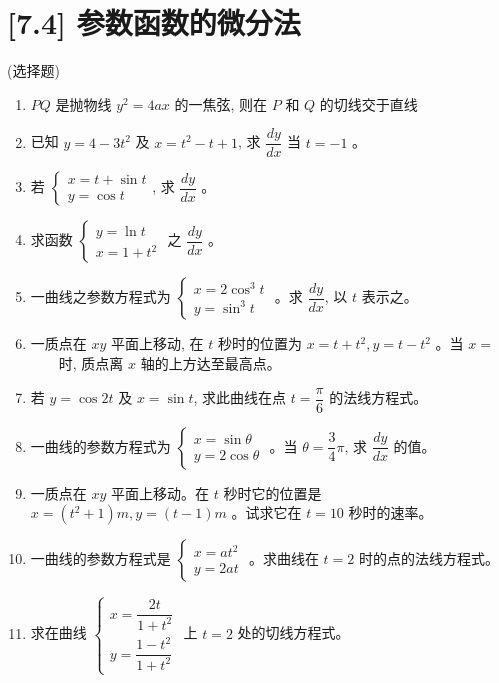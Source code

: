 \documentclass[10pt]{article}
\begin{document}
\begin{enumerate}
\end{enumerate}


\section*{[7.4] 参数函数的微分法}
(选择题)

\begin{enumerate}
  \item $PQ$ 是抛物线 $y^{2}=4 a x$ 的一焦弦, 则在 $P$ 和 $Q$ 的切线交于直线
  \item 已知 $y=4-3 t^{2}$ 及 $x=t^{2}-t+1$, 求 $\dfrac{d y}{d x}$ 当 $t=-1$ 。
  \item 若 $\left\{\begin{array}{l}x=t+\sin t \\ y=\cos t\end{array}\right.$, 求 $\dfrac{d y}{d x}$ 。
  \item 求函数 $\left\{\begin{array}{l}y=\ln t \\ x=1+t^{2}\end{array}\right.$ 之 $\dfrac{d y}{d x}$ 。
  \item 一曲线之参数方程式为 $\left\{\begin{array}{l}x=2 \cos ^{3} t \\ y=\sin ^{3} t\end{array}\right.$ 。求 $\dfrac{d y}{d x}$, 以 $t$ 表示之。
  \item 一质点在 $x y$ 平面上移动, 在 $t$ 秒时的位置为 $x=t+t^{2}, y=t-t^{2}$ 。当 $x=$ $\qquad$时, 质点离 $x$ 轴的上方达至最高点。
  \item 若 $y=\cos 2 t$ 及 $x=\sin t$, 求此曲线在点 $t=\dfrac{\pi}{6}$ 的法线方程式。
  \item 一曲线的参数方程式为 $\left\{\begin{array}{l}x=\sin \theta \\ y=2 \cos \theta\end{array}\right.$ 。当 $\theta=\dfrac{3}{4} \pi$, 求 $\dfrac{d y}{d x}$ 的值。
  \item 一质点在 $x y$ 平面上移动。在 $t$ 秒时它的位置是 $x=\left(t^{2}+1\right) m, y=(t-1) m$ 。试求它在 $t=10$ 秒时的速率。
  \item 一曲线的参数方程式是 $\left\{\begin{array}{l}x=a t^{2} \\ y=2 a t\end{array}\right.$ 。求曲线在 $t=2$ 时的点的法线方程式。
  \item 求在曲线 $\left\{\begin{array}{l}x=\dfrac{2 t}{1+t^{2}} \\ y=\dfrac{1-t^{2}}{1+t^{2}}\end{array}\right.$ 上 $t=2$ 处的切线方程式。

\end{enumerate}
\end{document}
